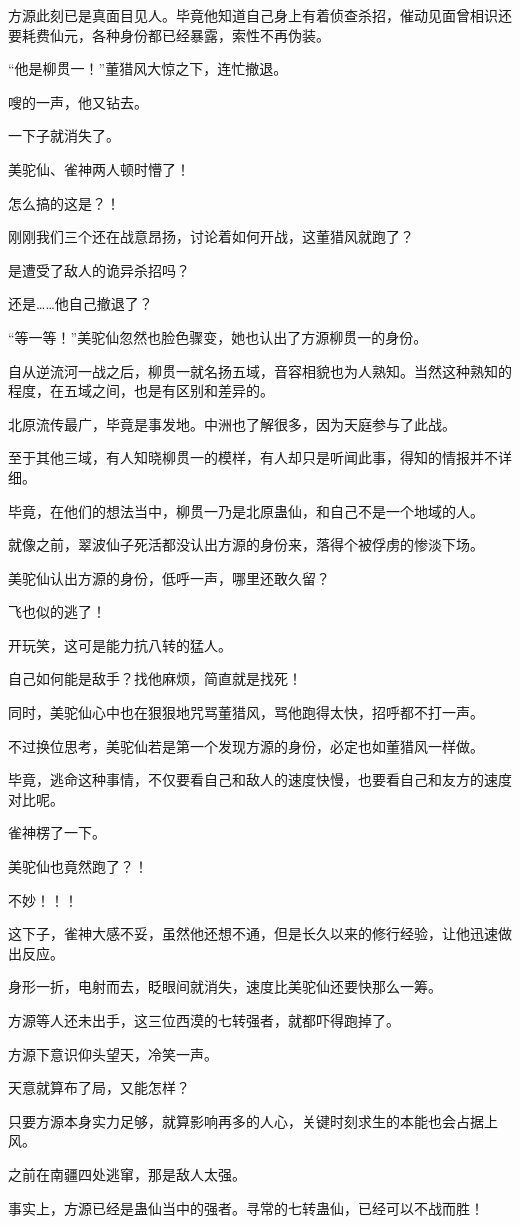 \begin{this_body}
方源此刻已是真面目见人。毕竟他知道自己身上有着侦查杀招，催动见面曾相识还要耗费仙元，各种身份都已经暴露，索性不再伪装。

“他是柳贯一！”董猎风大惊之下，连忙撤退。

嗖的一声，他又钻去。

一下子就消失了。

美驼仙、雀神两人顿时懵了！

怎么搞的这是？！

刚刚我们三个还在战意昂扬，讨论着如何开战，这董猎风就跑了？

是遭受了敌人的诡异杀招吗？

还是……他自己撤退了？

“等一等！”美驼仙忽然也脸色骤变，她也认出了方源柳贯一的身份。

自从逆流河一战之后，柳贯一就名扬五域，音容相貌也为人熟知。当然这种熟知的程度，在五域之间，也是有区别和差异的。

北原流传最广，毕竟是事发地。中洲也了解很多，因为天庭参与了此战。

至于其他三域，有人知晓柳贯一的模样，有人却只是听闻此事，得知的情报并不详细。

毕竟，在他们的想法当中，柳贯一乃是北原蛊仙，和自己不是一个地域的人。

就像之前，翠波仙子死活都没认出方源的身份来，落得个被俘虏的惨淡下场。

美驼仙认出方源的身份，低呼一声，哪里还敢久留？

飞也似的逃了！

开玩笑，这可是能力抗八转的猛人。

自己如何能是敌手？找他麻烦，简直就是找死！

同时，美驼仙心中也在狠狠地咒骂董猎风，骂他跑得太快，招呼都不打一声。

不过换位思考，美驼仙若是第一个发现方源的身份，必定也如董猎风一样做。

毕竟，逃命这种事情，不仅要看自己和敌人的速度快慢，也要看自己和友方的速度对比呢。

雀神楞了一下。

美驼仙也竟然跑了？！

不妙！！！

这下子，雀神大感不妥，虽然他还想不通，但是长久以来的修行经验，让他迅速做出反应。

身形一折，电射而去，眨眼间就消失，速度比美驼仙还要快那么一筹。

方源等人还未出手，这三位西漠的七转强者，就都吓得跑掉了。

方源下意识仰头望天，冷笑一声。

天意就算布了局，又能怎样？

只要方源本身实力足够，就算影响再多的人心，关键时刻求生的本能也会占据上风。

之前在南疆四处逃窜，那是敌人太强。

事实上，方源已经是蛊仙当中的强者。寻常的七转蛊仙，已经可以不战而胜！

\end{this_body}

